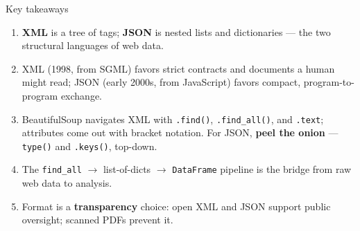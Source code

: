\documentclass[9pt,aspectratio=169]{beamer}
\begin{document}
\begin{frame}{Key takeaways}
    \begin{enumerate}
        \item \textbf{XML} is a tree of tags; \textbf{JSON} is nested lists and dictionaries --- the two structural languages of web data.
        \item XML (1998, from SGML) favors strict contracts and documents a human might read; JSON (early 2000s, from JavaScript) favors compact, program-to-program exchange.
        \item BeautifulSoup navigates XML with \texttt{.find()}, \texttt{.find\_all()}, and \texttt{.text}; attributes come out with bracket notation. For JSON, \textbf{peel the onion} --- \texttt{type()} and \texttt{.keys()}, top-down.
        \item The \texttt{find\_all} $\rightarrow$ list-of-dicts $\rightarrow$ \texttt{DataFrame} pipeline is the bridge from raw web data to analysis.
        \item Format is a \textbf{transparency} choice: open XML and JSON support public oversight; scanned PDFs prevent it.
    \end{enumerate}
\end{frame}
\end{document}
